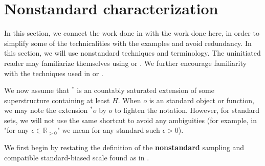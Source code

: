 \documentclass[10pt,a4paper]{amsart}
\def \LL{\langle}
\def \RR{\rangle}
\begin{document}
\appendix
\section{Nonstandard characterization}\label{appendix_nonstandad}

In this section, we connect the work done in \cite{nonez2024spectralequivalencesnonstandardsamplings} with the work done here, in order to simplify some of the technicalities with the examples and avoid redundancy. In this section, we will use nonstandard techniques and terminology. The uninitiated reader may familiarize themselves using \cite{nsarecent} or \cite{arkeryd2012nonstandard}. We further encourage familiarity with the techniques used in \cite{nonez2024spectralequivalencesnonstandardsamplings} or \cite{goldbring2025nonstandardapproachdirectintegral}. 

We now assume that ${}^*$ is an countably saturated extension of some superstructure containing at least $H$. When $o$ is an standard object or function, we may note the extension ${}^*o$ by $o$  to lighten the notation. However, for standard sets, we will not use the same shortcut to avoid any ambiguities (for example, in "for any $\epsilon\in\mathbb{R}_{>0}$" we mean for any standard such $\epsilon>0$).

We first begin by restating the definition of the \textbf{nonstandard} sampling and compatible standard-biased scale found as in \cite{nonez2024spectralequivalencesnonstandardsamplings}.
\end{document}
